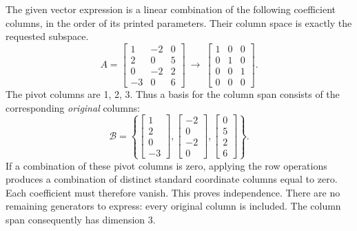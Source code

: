 The given vector expression is a linear combination of the following coefficient columns, in the order of its printed parameters. Their column space is exactly the requested subspace.
\[A=\left[\begin{array}{rrr}1&-2&0\\2&0&5\\0&-2&2\\-3&0&6\end{array}\right]\ \longrightarrow\ \left[\begin{array}{rrr}1&0&0\\0&1&0\\0&0&1\\0&0&0\end{array}\right].\]
The pivot columns are 1, 2, 3. Thus a basis for the column span consists of the corresponding \emph{original} columns:
\[\mathcal B=\left\{\left[\begin{array}{r}1\\2\\0\\-3\end{array}\right],\left[\begin{array}{r}-2\\0\\-2\\0\end{array}\right],\left[\begin{array}{r}0\\5\\2\\6\end{array}\right]\right\}.\]
If a combination of these pivot columns is zero, applying the row operations produces a combination of distinct standard coordinate columns equal to zero. Each coefficient must therefore vanish. This proves independence. There are no remaining generators to express: every original column is included. The column span consequently has dimension $3$.

